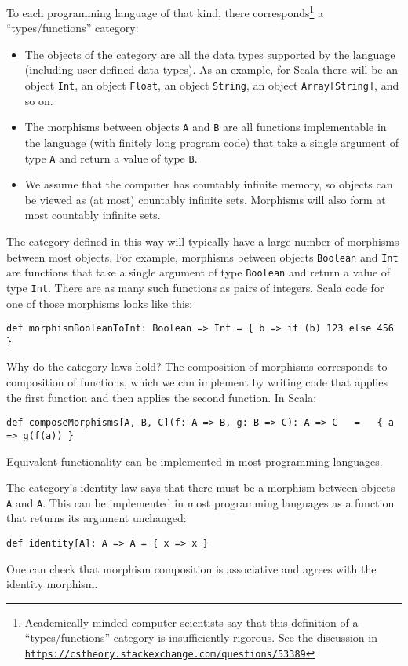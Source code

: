 To each programming language of that kind, there corresponds\footnote{Academically minded computer scientists say that this definition of
a \textsf{``}types/functions\textsf{''} category is insufficiently rigorous. See the
discussion in \texttt{\href{https://cstheory.stackexchange.com/questions/53389}{https://cstheory.stackexchange.com/questions/53389}}} a \textsf{``}types/functions\textsf{''} category:
\begin{itemize}
\item The objects of the category are all the data types supported by the
language (including user-defined data types). As an example, for Scala
there will be an object \lstinline!Int!, an object \lstinline!Float!,
an object \lstinline!String!, an object \lstinline!Array[String]!,
and so on.
\item The morphisms between objects \lstinline!A! and \lstinline!B! are
all functions implementable in the language (with finitely long program
code) that take a single argument of type \lstinline!A! and return
a value of type \lstinline!B!.
\item We assume that the computer has countably infinite memory, so objects
can be viewed as (at most) countably infinite sets. Morphisms will
also form at most countably infinite sets.
\end{itemize}
The category defined in this way will typically have a large number
of morphisms between most objects. For example, morphisms between
objects \lstinline!Boolean! and \lstinline!Int! are functions that
take a single argument of type \lstinline!Boolean! and return a value
of type \lstinline!Int!. There are as many such functions as pairs
of integers. Scala code for one of those morphisms looks like this:
\begin{lstlisting}
def morphismBooleanToInt: Boolean => Int = { b => if (b) 123 else 456 }
\end{lstlisting}

Why do the category laws hold? The composition of morphisms corresponds
to composition of functions, which we can implement by writing code
that applies the first function and then applies the second function.
In Scala:
\begin{lstlisting}
def composeMorphisms[A, B, C](f: A => B, g: B => C): A => C   =   { a => g(f(a)) }
\end{lstlisting}
Equivalent functionality can be implemented in most programming languages.

The category\textsf{'}s identity law says that there must be a morphism between
objects \lstinline!A! and \lstinline!A!. This can be implemented
in most programming languages as a function that returns its argument
unchanged:
\begin{lstlisting}
def identity[A]: A => A = { x => x }
\end{lstlisting}
One can check that morphism composition is associative and agrees
with the identity morphism.

